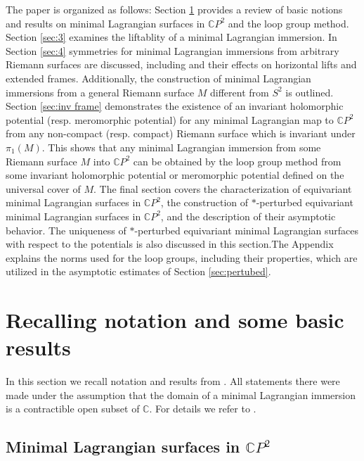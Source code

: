 \documentclass[a4paper,11pt]{amsart}
\theoremstyle{definition}
\numberwithin{equation}{section}
\newcommand{\C}{\mathbb{C}}
\begin{document}
 The paper is organized as follows: Section \ref{sec:2} provides a review of basic notions and results on minimal Lagrangian surfaces in $\mathbb{C} P^2$ and the loop group method.
 Section \ref{sec:3} examines  the liftablity of a minimal Lagrangian immersion.
 In Section \ref{sec:4}  symmetries for minimal Lagrangian immersions from arbitrary Riemann surfaces are discussed, including and their effects on horizontal lifts and extended frames.
 Additionally, the construction of minimal Lagrangian immersions from a general Riemann surface $M$ different from $S^2$ is outlined. 
 Section \ref{sec:inv frame} demonstrates  the existence of an  invariant  holomorphic potential (resp. meromorphic potential) for any minimal Lagrangian map to $\mathbb{C} P^2$ from any non-compact (resp. compact) Riemann surface which is invariant under $\pi_1(M)$.  
 This shows that any  minimal Lagrangian
immersion  from some Riemann surface $M$ into $\mathbb{C} P^2$
can be obtained by the loop group method from some 
invariant holomorphic potential or meromorphic potential defined on the universal cover of $M$. 
 The final section covers the characterization of equivariant minimal Lagrangian surfaces in $\mathbb{C}P^2$, the construction of $*$-perturbed equivariant minimal Lagrangian surfaces in $\mathbb{C} P^2$, and the description of their asymptotic behavior. The uniqueness of $*$-perturbed equivariant minimal Lagrangian surfaces with respect to the potentials is also discussed in this section.The Appendix explains the norms used for the loop groups, including their properties, which are utilized in the asymptotic estimates of Section  \ref{sec:pertubed}.
 

  

\section{Recalling notation and some basic results}\label{sec:2}

In this section we recall notation and results from \cite{DoMaB1}.
All statements there were made under the assumption that  the
domain of a minimal Lagrangian immersion is a contractible open subset of $\C$. 
For details we refer to \cite{DoMaB1}.


\subsection{Minimal Lagrangian surfaces in \texorpdfstring{$\mathbb{C}P^2$}{} }
\label{subsec:miL}
\end{document}

